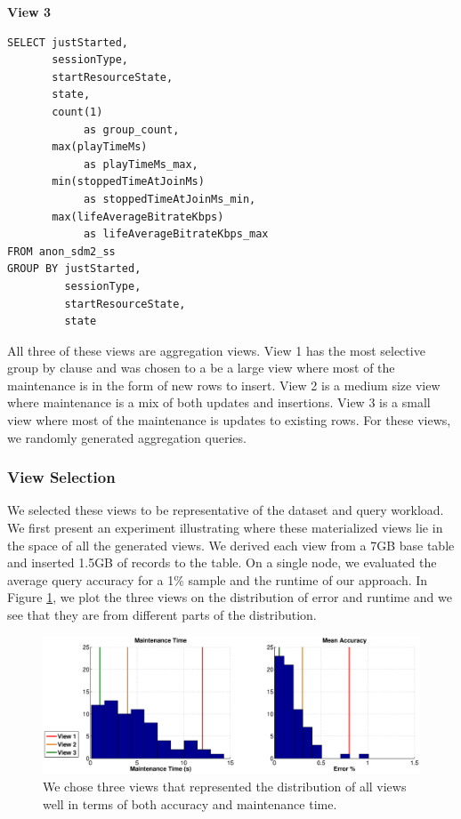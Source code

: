 \vspace{1em}

\textbf{View 3}
\begin{lstlisting}
SELECT justStarted, 
       sessionType, 
       startResourceState, 
       state, 
       count(1) 
            as group_count, 
       max(playTimeMs) 
            as playTimeMs_max, 
       min(stoppedTimeAtJoinMs) 
            as stoppedTimeAtJoinMs_min, 
       max(lifeAverageBitrateKbps) 
            as lifeAverageBitrateKbps_max 
FROM anon_sdm2_ss 
GROUP BY justStarted, 
         sessionType, 
         startResourceState, 
         state
\end{lstlisting}

All three of these views are aggregation views. 
View 1 has the most selective group by clause and was chosen to a be a large view where most of the maintenance is in the form of new rows to insert.
View 2 is a medium size view where maintenance is a mix of both updates and insertions.
View 3 is a small view where most of the maintenance is updates to existing rows.
For these views, we randomly generated aggregation queries.

\subsubsection{View Selection}
We selected these views to be representative of the dataset and query workload. 
We first present an experiment illustrating where these materialized views lie in the space of all the generated views.
We derived each view from a 7GB base table and inserted 1.5GB of records to the table. 
On a single node, we evaluated the average query accuracy for a 1\% sample and the runtime of our approach.
In Figure \ref{exp12conviva}, we plot the three views on the distribution of error and runtime and we see that they 
are from different parts of the distribution.
\begin{figure}[ht!]
\label{exp12conviva}
\centering
\includegraphics[width=\columnwidth]{exp/conviva_efficiency_accuracy.eps}
 \caption{We chose three views that represented the distribution of all views well in terms of both accuracy and maintenance time.}
\end{figure}

